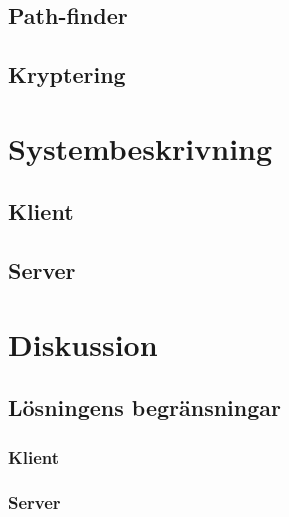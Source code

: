 \documentclass[10pt, titlepage, oneside, a4paper]{article}
\begin{document}
    	\subsection{Path-finder}
    	\subsection{Kryptering}
    	
    \section{Systembeskrivning}
    	\subsection{Klient}
    	\subsection{Server}
    		
    \section{Diskussion}
    	\subsection{Lösningens begränsningar}
    		\subsubsection{Klient}
    		\subsubsection{Server}
\end{document}
